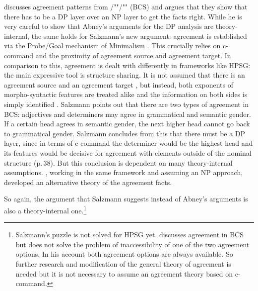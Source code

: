 \documentclass[output=paper
  ,nobabel
  ,draftmode
  ,uniformtopskip %
  ,colorlinks, citecolor=brown
]{langscibook}
\begin{document}
\largerpage
\citet[Section~4.3]{Salzmann2020a} discusses agreement patterns from
/""/"" (BCS) and argues that they show that there has to be a DP layer over an
NP layer to get the facts right. While he is very careful to show that Abney's
\citeyearpar{Abney87a} arguments
for the DP analysis are theory-internal, the same holds for Salzmann's new argument: agreement is
established via the Probe/Goal mechanism of Minimalism \citep{Chomsky2001a-u}. This crucially relies
on c-command and the proximity of agreement source and agreement target. In comparison to this,
agreement is dealt with differently in frameworks like HPSG: the main expressive tool is structure
sharing. It is not assumed that there is an agreement source and an agreement target
\citep[Section~2.2]{ps2}, but instead, both exponents of morpho-syntactic features are treated alike
and the information on both sides is simply identified
\parencites[Chapter~2]{ps2}{Kathol99b}{WZ2003a}{VanEynde2021a}. Salzmann points out that there are
two types of agreement in BCS: adjectives and determiners may agree in grammatical and semantic
gender. If a certain head agrees in semantic gender, the next higher head cannot go back to
grammatical gender. Salzmann concludes from this that there must be a DP layer, since in terms of
c-command the determiner would be the highest head and its features would be decisive for agreement
with elements outside of the nominal structure (p.\,38). But this conclusion is dependent on many
theory-internal assumptions. \citet[Section~4]{Bruening2020a}, working in the same framework and
assuming an NP approach, developed an alternative theory of the agreement facts.

So again, the argument that Salzmann suggests instead of Abney's arguments is also a
theory-internal one.\footnote{
  Salzmann's puzzle is not solved for HPSG yet. \citet{VanEynde2020b} discusses agreement in BCS but
  does not solve the problem of inaccessibility of one of the two agreement options. In his account
  both agreement options are always available. So further research and modification of the general theory of
  agreement is needed but it is not necessary to assume an agreement theory based on c-command.
}
\end{document}
